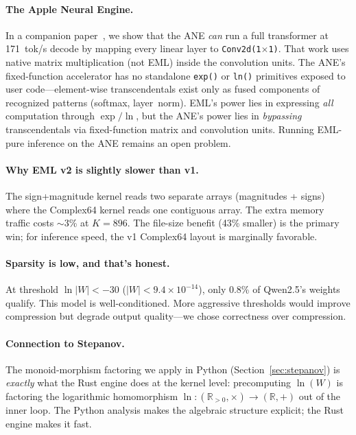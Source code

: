 \documentclass[acmsmall,nonacm]{acmart}
\begin{document}
\paragraph{The Apple Neural Engine.}
In a companion paper~\cite{videla2026ane}, we show that the ANE
\emph{can} run a full transformer at 171~tok/s decode by mapping every
linear layer to \texttt{Conv2d(1$\times$1)}.  That work uses native
matrix multiplication (not EML) inside the convolution units.
The ANE's fixed-function accelerator has no standalone \texttt{exp()} or
\texttt{ln()} primitives exposed to user code---element-wise
transcendentals exist only as fused components of recognized patterns
(softmax, layer~norm).  EML's power lies in expressing \emph{all}
computation through $\exp/\ln$, but the ANE's power lies in
\emph{bypassing} transcendentals via fixed-function matrix and
convolution units.  Running EML-pure inference on the ANE remains an
open problem.

\paragraph{Why EML v2 is slightly slower than v1.}
The sign+magnitude kernel reads two separate arrays (magnitudes + signs)
where the Complex64 kernel reads one contiguous array.  The extra memory
traffic costs $\sim$3\% at $K{=}896$.  The file-size benefit (43\%
smaller) is the primary win; for inference speed, the v1 Complex64
layout is marginally favorable.

\paragraph{Sparsity is low, and that's honest.}
At threshold $\ln|W| < -30$ ($|W| < 9.4 \times 10^{-14}$), only 0.8\%
of Qwen2.5's weights qualify.  This model is well-conditioned.  More
aggressive thresholds would improve compression but degrade output
quality---we chose correctness over compression.

\paragraph{Connection to Stepanov.}
The monoid-morphism factoring we apply in Python (Section~\ref{sec:stepanov})
is \emph{exactly} what the Rust engine does at the kernel level:
precomputing $\ln(W)$ is factoring the logarithmic homomorphism
$\ln\colon(\mathbb{R}_{>0},\times) \to (\mathbb{R},+)$ out of the
inner loop.  The Python analysis makes the algebraic structure explicit;
the Rust engine makes it fast.
\end{document}
